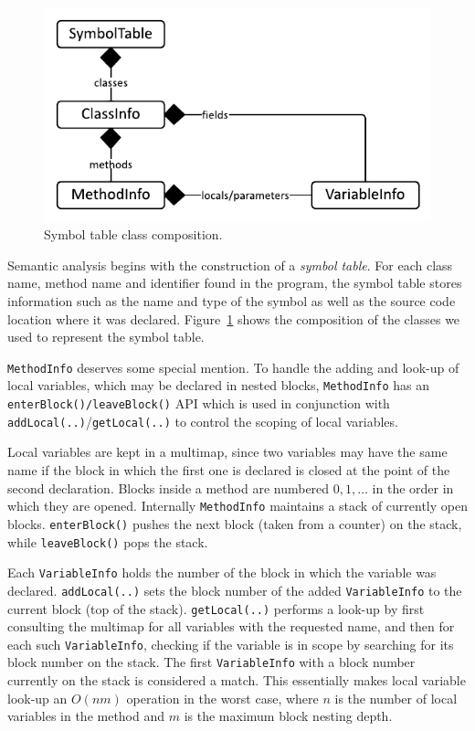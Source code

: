 \documentclass[a4paper,11pt]{article}
\begin{document}
\begin{figure}[h!]
    \centering
    \includegraphics[scale=0.9]{figures/symbol_table_classes.pdf}
    \caption{Symbol table class composition.}
    \label{fig:symbol_table_classes}
\end{figure}

Semantic analysis begins with the construction of a \emph{symbol table}. For
each class name, method name and identifier found in the program, the symbol table
stores information such as the name and type of the symbol as well as the source
code location where it was declared. Figure~\ref{fig:symbol_table_classes} shows the
composition of the classes we used to represent the symbol table.

\texttt{MethodInfo} deserves some special mention. To handle the adding and look-up of
local variables, which may be declared in nested blocks, \texttt{MethodInfo} has
an \texttt{enterBlock()/leaveBlock()} API which is used in conjunction with
\texttt{addLocal(..)}/\texttt{getLocal(..)} to control the scoping of local variables.

Local variables are kept in a multimap, since two variables may have the same name if
the block in which the first one is declared is closed at the point of the second
declaration. Blocks inside a method are numbered $0, 1, \ldots$ in the order in which
they are opened. Internally \texttt{MethodInfo} maintains a stack of currently
open blocks. \texttt{enterBlock()} pushes the next block (taken from a counter) on
the stack, while \texttt{leaveBlock()} pops the stack.

Each \texttt{VariableInfo} holds the number of the block in which the variable
was declared. \texttt{addLocal(..)} sets the block number of the added
\texttt{VariableInfo} to the current block (top of the stack). \texttt{getLocal(..)}
performs a look-up by first consulting the multimap for all variables with the
requested name, and then for each such \texttt{VariableInfo}, checking if the
variable is in scope by searching for its block number on the stack. The first
\texttt{VariableInfo} with a block number currently on the stack is considered a
match. This essentially makes local variable look-up an $O(nm)$ operation in the
worst case, where $n$ is the number of local variables in the method and $m$ is
the maximum block nesting depth.
\end{document}
